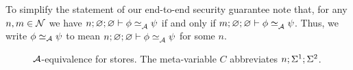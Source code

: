 To simplify the statement of our end-to-end security guarantee note that, for any $n, m \in \mathcal{N}$ we have $\loweq{n; \emptyenv; \emptyenv}{\Attacker}{\store}{\altstore}$ if and only if $\loweq{m; \emptyenv; \emptyenv}{\Attacker}{\store}{\altstore}$. Thus, we write $\phi \simeq_{\mathcal{A}} \psi$ to mean $\loweq{n; \emptyenv; \emptyenv}{\Attacker}{\store}{\altstore}$ for some $n$.

\begin{figure}
    \centering
    \caption{$\mathcal{A}$-equivalence for stores. The meta-variable $C$ abbreviates $n; \Sigma^1; \Sigma^2$.}
    \label{fig:low-eq-memories}
\end{figure}

